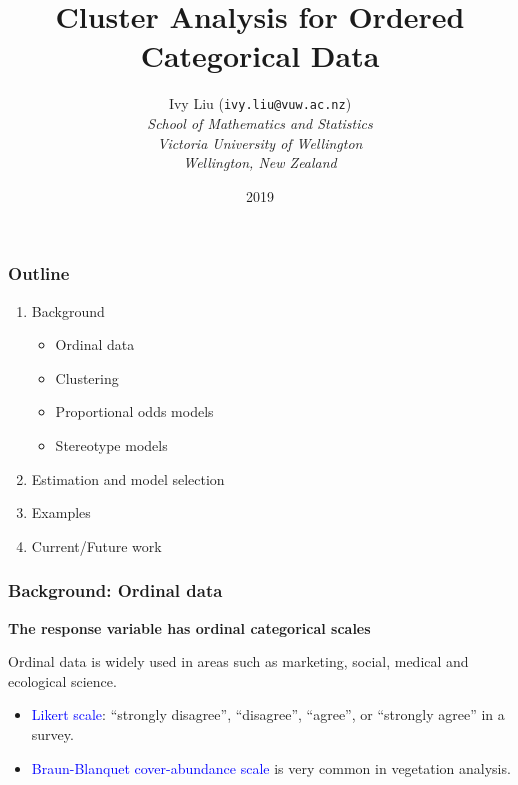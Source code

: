 \documentclass[xcolor=svgnames]{beamer}
\begin{document}
\title{Cluster Analysis for Ordered Categorical Data}
\author{Ivy Liu ({\tt ivy.liu@vuw.ac.nz})\\[1em]
{\em School of Mathematics and Statistics\\
Victoria University of Wellington\\
Wellington, New Zealand}\\[1em]
}
\date{2019}


\begin{frame}\frametitle{
}
\titlepage
\end{frame}


\begin{frame}\frametitle{Outline}

\begin{enumerate}
\item Background
\begin{itemize}
\item Ordinal data
\item Clustering
\item Proportional odds models
\item Stereotype models
\end{itemize}
\item Estimation and model selection
\item Examples
\item Current/Future work
\end{enumerate}

\end{frame}

\begin{frame}\frametitle{Background: Ordinal data}

{\bf The response variable has ordinal categorical scales}

Ordinal data is widely used in areas such as marketing, social, medical and ecological science.

\begin{itemize}
\pause
\item  \textcolor{blue}{Likert scale}:  ``strongly disagree'', ``disagree'', ``agree'', or ``strongly agree'' in a survey.
\pause
\item \textcolor{blue}{Braun-Blanquet cover-abundance scale} is very common in vegetation analysis. 
\end{itemize}

\end{frame}
\end{document}
